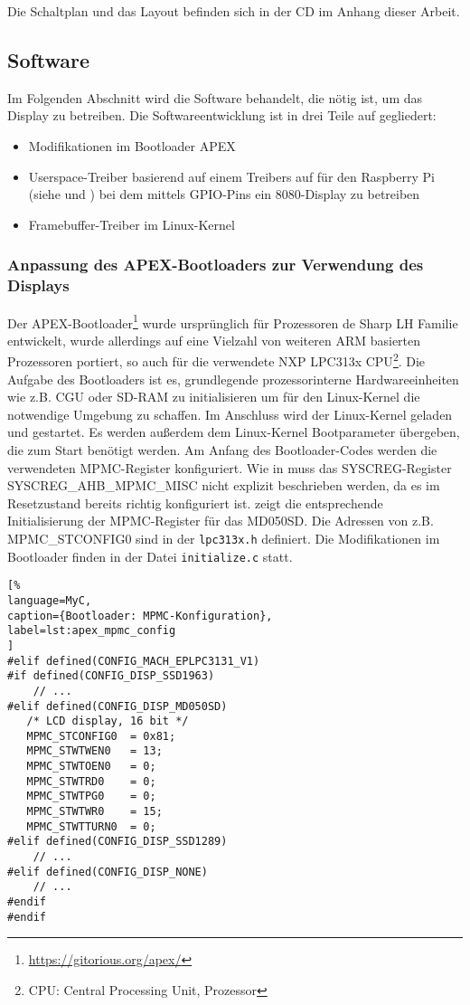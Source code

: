 Die Schaltplan und das Layout befinden sich in der CD im Anhang dieser Arbeit.
\newpage
\subsection{Software}
Im Folgenden Abschnitt wird die Software behandelt, die nötig ist, um das Display zu betreiben. 
Die Softwareentwicklung ist in drei Teile auf gegliedert:
\begin{itemize}
\item Modifikationen im Bootloader APEX
\item Userspace-Treiber basierend auf einem Treibers auf für den Raspberry Pi (siehe \cite{Schlegel2013a} und \cite{Schlegel2013b}) bei dem mittels GPIO-Pins ein 8080-Display zu betreiben
\item Framebuffer-Treiber im Linux-Kernel
\end{itemize}

\subsubsection{Anpassung des APEX-Bootloaders zur Verwendung des Displays}
Der APEX-Bootloader\footnote{\url{https://gitorious.org/apex/}} wurde ursprünglich für Prozessoren de Sharp LH Familie entwickelt, wurde allerdings auf eine Vielzahl von weiteren ARM basierten Prozessoren portiert, so auch für die verwendete NXP LPC313x CPU\footnote{CPU: Central Processing Unit, Prozessor}.
Die Aufgabe des Bootloaders ist es, grundlegende prozessorinterne Hardwareeinheiten wie z.B. CGU oder SD-RAM zu initialisieren um für den Linux-Kernel die notwendige Umgebung zu schaffen. Im Anschluss wird der Linux-Kernel geladen und gestartet. Es werden außerdem dem Linux-Kernel Bootparameter übergeben, die zum Start benötigt werden. Am Anfang des Bootloader-Codes werden die verwendeten MPMC-Register konfiguriert. Wie in  muss das SYSCREG-Register SYSCREG\_AHB\_MPMC\_MISC nicht explizit beschrieben werden, da es im Resetzustand bereits richtig konfiguriert ist.  zeigt die entsprechende Initialisierung der MPMC-Register für das MD050SD. Die Adressen von z.B. MPMC\_STCONFIG0 sind in der \lstinline|lpc313x.h| definiert. Die Modifikationen im Bootloader finden in der Datei \lstinline|initialize.c| statt.

\begin{lstlisting}[%
language=MyC,
caption={Bootloader: MPMC-Konfiguration},
label=lst:apex_mpmc_config
]
#elif defined(CONFIG_MACH_EPLPC3131_V1)
#if defined(CONFIG_DISP_SSD1963)
	// ...
#elif defined(CONFIG_DISP_MD050SD)
   /* LCD display, 16 bit */
   MPMC_STCONFIG0  = 0x81;
   MPMC_STWTWEN0   = 13;
   MPMC_STWTOEN0   = 0;
   MPMC_STWTRD0    = 0;
   MPMC_STWTPG0    = 0;
   MPMC_STWTWR0    = 15;
   MPMC_STWTTURN0  = 0;
#elif defined(CONFIG_DISP_SSD1289)
	// ...
#elif defined(CONFIG_DISP_NONE)
	// ...
#endif
#endif
\end{lstlisting}


